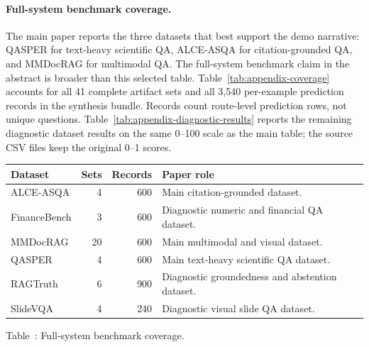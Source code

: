 \paragraph{Full-system benchmark coverage.}

The main paper reports the three datasets that best support the demo narrative: QASPER for text-heavy scientific QA, ALCE-ASQA for citation-grounded QA, and MMDocRAG for multimodal QA. The full-system benchmark claim in the abstract is broader than this selected table. Table~\ref{tab:appendix-coverage} accounts for all 41 complete artifact sets and all 3,540 per-example prediction records in the synthesis bundle. Records count route-level prediction rows, not unique questions. Table~\ref{tab:appendix-diagnostic-results} reports the remaining diagnostic dataset results on the same 0--100 scale as the main table; the source CSV files keep the original 0--1 scores.

\begin{center}
\small
\setlength{\tabcolsep}{3pt}
\begin{tabularx}{\linewidth}{@{}lrr>{\raggedright\arraybackslash}X@{}}
\toprule
\rowcolor{gray!10}
Dataset & Sets & Records & Paper role \\
\midrule
ALCE-ASQA & 4 & 600 & Main citation-grounded dataset. \\
FinanceBench & 3 & 600 & Diagnostic numeric and financial QA dataset. \\
MMDocRAG & 20 & 600 & Main multimodal and visual dataset. \\
QASPER & 4 & 600 & Main text-heavy scientific QA dataset. \\
RAGTruth & 6 & 900 & Diagnostic groundedness and abstention dataset. \\
SlideVQA & 4 & 240 & Diagnostic visual slide QA dataset. \\
\bottomrule
\end{tabularx}
\label{tab:appendix-coverage}
\smallskip
Table~\thetable: Full-system benchmark coverage.
\end{center}

